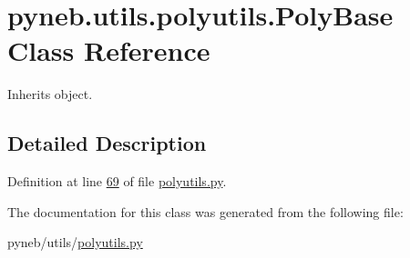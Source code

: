 \hypertarget{classpyneb_1_1utils_1_1polyutils_1_1_poly_base}{}\section{pyneb.\+utils.\+polyutils.\+Poly\+Base Class Reference}
\label{classpyneb_1_1utils_1_1polyutils_1_1_poly_base}


Inherits object.



\subsection{Detailed Description}


Definition at line \hyperlink{polyutils_8py_source_l00069}{69} of file \hyperlink{polyutils_8py_source}{polyutils.\+py}.



The documentation for this class was generated from the following file\+:\begin{DoxyCompactItemize}
\item 
pyneb/utils/\hyperlink{polyutils_8py}{polyutils.\+py}\end{DoxyCompactItemize}
